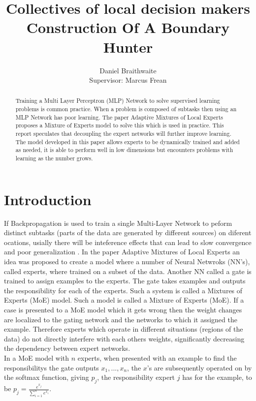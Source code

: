 \documentclass[notitlepage]{report}
\title{%
	Collectives of local decision makers\\
	\large Construction Of A Boundary Hunter
}
\author{Daniel Braithwaite\\[1cm] {Supervisor: Marcus Frean}}
\theoremstyle{definition}
\begin{document}
\begin{titlingpage}
    \maketitle
    \begin{abstract}
    	Training a Multi Layer Perceptron (MLP) Network to solve supervised learning problems is common practice. When a problem is composed of subtasks then using an MLP Network has poor learning. The paper Adaptive Mixtures of Local Experts \cite{jacobs1991adaptive} proposes a Mixture of Experts model to solve this which is used in practice. This report speculates that decoupling the expert networks will further improve learning. The model developed in this paper allows experts to be dynamically trained and added as needed, it is able to perform well in low dimensions but encounters problems with learning as the number grows.
    \end{abstract}
\end{titlingpage}

\chapter{Introduction}

If Backpropagation is used to train a single Multi-Layer Network to peform distinct subtasks (parts of the data are generated by different sources) on diferent ocations, usially there will be inteference effects that can lead to slow convergence and poor generalization \cite{jacobs1991adaptive}.  In the paper Adaptive Mixtures of Local Experts \cite{jacobs1991adaptive} an idea was proposed to create a model where a number of Neural Netwroks (NN's), called experts, where trained on a subset of the data. Another NN called a gate is trained to assign examples to the experts. The gate takes examples and outputs the responsibility for each of the experts. Such a system is called a Mixtures of Experts (MoE) model. Such a model is called a Mixture of Experts (MoE). If a case is presented to a MoE model which it gets wrong then the weight changes are localized to the gating network and the networks to which it assigned the example. Therefore experts which operate in different situations (regions of the data) do not directly interfere with each others weights, significantly decreasing the dependency between expert networks.\\

In a MoE model with $n$ experts, when presented with an example to find the responsibilitys the gate outputs $x_1, ..., x_n$, the $x$'s are subsequently operated on by the softmax function, giving $p_j$, the responsibility expert $j$ has for the example, to be $p_j = \frac{e^{x_j}}{\sum_{i=1}^n e^{x_i}}$. \\
\end{document}
